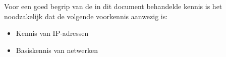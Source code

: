 Voor een goed begrip van de in dit document behandelde kennis is het noodzakelijk dat de volgende voorkennis aanwezig is:
\begin{itemize}
\item Kennis van IP-adressen
\item Basiskennis van netwerken
\end{itemize}

